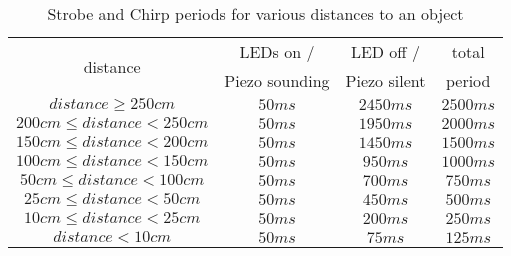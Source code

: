 \begin{table}
    \centering
    \begin{tabular}{||c|c|c|c||} \hline\hline
        \multirow{2}{*}{distance}   & LEDs on /         & LED off /         & total     \\
                                    & Piezo sounding    & Piezo silent      & period    \\ \hline\hline
        $distance \geq 250cm$          & $50ms$            & $2450ms$          & $2500ms$  \\ \hline
        $200cm \leq distance < 250cm$  & $50ms$            & $1950ms$          & $2000ms$  \\ \hline
        $150cm \leq distance < 200cm$  & $50ms$            & $1450ms$          & $1500ms$  \\ \hline
        $100cm \leq distance < 150cm$  & $50ms$            & $ 950ms$          & $1000ms$  \\ \hline
        $ 50cm \leq distance < 100cm$  & $50ms$            & $ 700ms$          & $ 750ms$  \\ \hline
        $ 25cm \leq distance <  50cm$  & $50ms$            & $ 450ms$          & $ 500ms$  \\ \hline
        $ 10cm \leq distance <  25cm$  & $50ms$            & $ 200ms$          & $ 250ms$  \\ \hline
        $distance < 10cm$           & $50ms$            & $  75ms$          & $ 125ms$  \\ \hline\hline
    \end{tabular}
    \caption{Strobe and Chirp periods for various distances to an object}\label{tab:alarmPeriods}
\end{table}